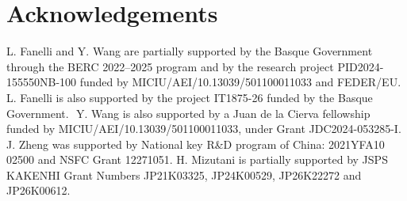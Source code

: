 \documentclass[10pt%
]{amsart}
\numberwithin{equation}{section}
\theoremstyle{definition}
\begin{document}
\section*{Acknowledgements}
L. Fanelli and Y. Wang are partially supported by the Basque Government through the BERC 2022--2025 program and by the research project PID2024-155550NB-100 funded by MICIU/AEI/10.13039/501100011033 and FEDER/EU.\,\,
L. Fanelli is also supported by the project IT1875-26 funded by the Basque Government.\,\,
Y. Wang is also supported by a Juan de la Cierva fellowship funded by MICIU/AEI/10.13039/501100011033, under Grant JDC2024-053285-I.\,\,
J. Zheng was supported by  National key R\&D program of China: 2021YFA10\\02500 and  NSFC Grant 12271051.\,\,H. Mizutani is partially supported by JSPS KAKENHI Grant Numbers JP21K03325, JP24K00529, JP26K22272 and JP26K00612. 
\end{document}
